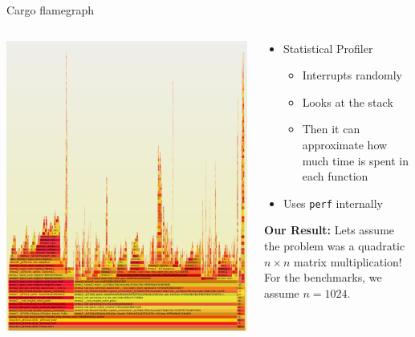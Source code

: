 \documentclass[compress,aspectratio=169]{beamer}
\begin{document}
\begin{frame}{Cargo flamegraph}
  \begin{columns}
    \begin{column}{0.5\textwidth}
    \includegraphics[height=.9\textheight]{./assets/flamegraph.png}
    \end{column}
    \begin{column}{0.5\textwidth}
  \begin{itemize}
    \item Statistical Profiler
      \begin{itemize}
        \item Interrupts randomly
        \item Looks at the stack
        \item Then it can approximate how much time is spent in each function
      \end{itemize}
    \item Uses \texttt{perf} internally
  \end{itemize}
    \textbf{Our Result:} Lets assume the problem was a quadratic $n\times n$ matrix multiplication!\\
    For the benchmarks, we assume $n=1024$.
    \end{column}
  \end{columns}
\end{frame}
\end{document}
